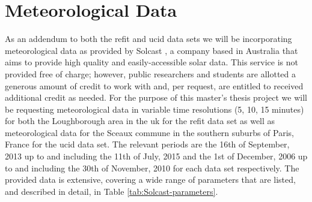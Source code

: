 \section{Meteorological Data}
\label{sec:Data-Description:Meteorological-Data}
As an addendum to both the \gls{refit} and \gls{ucid} data sets we will be incorporating meteorological data as provided by Solcast \cite{Solcast}, a company based in Australia that aims to provide high quality and easily-accessible solar data. This service is not provided free of charge; however, public researchers and students are allotted a generous amount of credit to work with and, per request, are entitled to received additional credit as needed. For the purpose of this master's thesis project we will be requesting meteorological data in variable time resolutions (5, 10, 15 minutes) for both the Loughborough area in the \gls{uk} for the \gls{refit} data set as well as meteorological data for the Sceaux commune in the southern suburbs of Paris, France for the \gls{ucid} data set. The relevant periods are the 16th of September, 2013 up to and including the 11th of July, 2015 and the 1st of December, 2006 up to and including the 30th of November, 2010 for each data set respectively. The provided data is extensive, covering a wide range of parameters that are listed, and described in detail, in Table \ref{tab:Solcast-parameters}.

